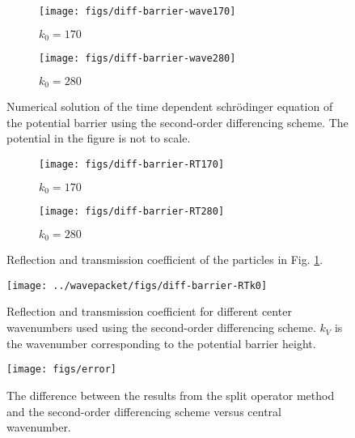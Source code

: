 \begin{figure}[H]
  \centering
  \begin{subfigure}{0.49\textwidth}
  \texttt{[image: figs/diff-barrier-wave170]}
  \caption{$k_0 = 170$}
  \end{subfigure}
  \begin{subfigure}{0.49\textwidth}
  \texttt{[image: figs/diff-barrier-wave280]}
  \caption{$k_0 = 280$}
  \end{subfigure}
  \caption{Numerical solution of the time dependent schrödinger equation of the potential barrier using the second-order differencing scheme. The potential in the figure is not to scale.}
  \label{fig:diff-wave}
\end{figure}


\begin{figure}[H]
  \centering
  \begin{subfigure}{0.49\textwidth}
  \texttt{[image: figs/diff-barrier-RT170]}
  \caption{$k_0 = 170$}
  \label{fig:diff_RT170}
  \end{subfigure}
  \begin{subfigure}{0.49\textwidth}
  \texttt{[image: figs/diff-barrier-RT280]}
  \caption{$k_0 = 280$}
  \end{subfigure}
  \caption{Reflection and transmission coefficient of the particles in Fig. \ref{fig:diff-wave}.}
  \label{fig:diff-RT}
\end{figure}

\begin{figure}[H]
  \centering
  \texttt{[image: ../wavepacket/figs/diff-barrier-RTk0]}
  \caption{Reflection and transmission coefficient for different center wavenumbers used using the second-order differencing scheme. $k_V$ is the wavenumber corresponding to the potential barrier height.}
  \label{fig:diff-k0}
\end{figure}

\begin{figure}[H]
  \centering
  \texttt{[image: figs/error]}
  \caption{The difference between the results from the split operator method and the second-order differencing scheme versus central wavenumber.}
  \label{fig:error}
\end{figure}

